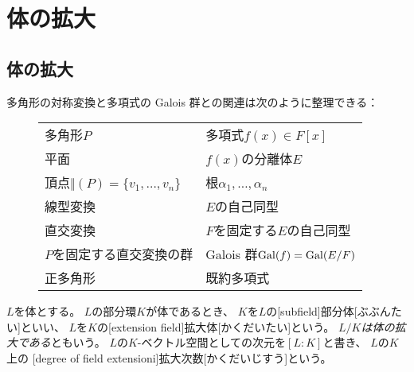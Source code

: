 \documentclass[report]{jlreq}
\begin{document}
%
\chapter{体の拡大}

%
\section{体の拡大}

多角形の対称変換と多項式の Galois 群との関連は次のように整理できる：


\begin{figure}[h]
    \centering
    \begin{tabular}{ll}
        多角形$P$ & 多項式$f(x) \in F[x]$ \\
        平面 & $f(x)$の分離体$E$ \\
        頂点$\Vert(P) = \{v_1, \dots, v_n\}$ & 根$\alpha_1, \dots, \alpha_n$ \\
        線型変換 & $E$の自己同型 \\
        直交変換 & $F$を固定する$E$の自己同型 \\
        $P$を固定する直交変換の群 & Galois 群$\operatorname{Gal}(f) = \operatorname{Gal}(E/F)$ \\
        正多角形 & 既約多項式
    \end{tabular}
\end{figure}

\begin{definition}[体の拡大]
    $L$を体とする。
    $L$の部分環$K$が体であるとき、
    $K$を$L$の[subfield]{部分体}[ぶぶんたい]といい、
    $L$を$K$の[extension field]{拡大体}[かくだいたい]という。
    \emph{$L/K$は体の拡大である}ともいう。
    $L$の$K$-ベクトル空間としての次元を$[L : K]$と書き、
    $L$の$K$上の
    [degree of field extensioni]{拡大次数}[かくだいじすう]という。
\end{definition}
\end{document}
